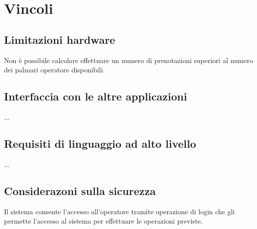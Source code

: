 \section{Vincoli}
    \subsection{Limitazioni hardware}
        Non \`e possibile calcolare effettuare un numero di prenotazioni superiori al numero 
        dei palmari operatore disponibili.
    \subsection{Interfaccia con le altre applicazioni}
        ...
    \subsection{Requisiti di linguaggio ad alto livello}
        ...
    \subsection{Considerazoni sulla sicurezza}
        Il sistema consente l'accesso  all'operatore tramite operazione di login che gli permette 
        l'accesso al sistema per effettuare le operazioni previste.
